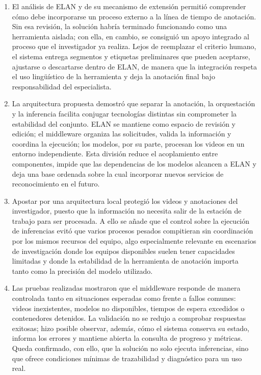 \begin{enumerate}
    \item El análisis de ELAN y de su mecanismo de extensión permitió comprender cómo debe incorporarse un proceso externo a la línea de tiempo de anotación. Sin esa revisión, la solución habría terminado funcionando como una herramienta aislada; con ella, en cambio, se consiguió un apoyo integrado al proceso que el investigador ya realiza. Lejos de reemplazar el criterio humano, el sistema entrega segmentos y etiquetas preliminares que pueden aceptarse, ajustarse o descartarse dentro de ELAN, de manera que la integración respeta el uso lingüístico de la herramienta y deja la anotación final bajo responsabilidad del especialista.

    \item La arquitectura propuesta demostró que separar la anotación, la orquestación y la inferencia facilita conjugar tecnologías distintas sin comprometer la estabilidad del conjunto. ELAN se mantiene como espacio de revisión y edición; el middleware organiza las solicitudes, valida la información y coordina la ejecución; los modelos, por su parte, procesan los videos en un entorno independiente. Esta división reduce el acoplamiento entre componentes, impide que las dependencias de los modelos alcancen a ELAN y deja una base ordenada sobre la cual incorporar nuevos servicios de reconocimiento en el futuro.

    \item Apostar por una arquitectura local protegió los videos y anotaciones del investigador, puesto que la información no necesita salir de la estación de trabajo para ser procesada. A ello se añade que el control sobre la ejecución de inferencias evitó que varios procesos pesados compitieran sin coordinación por los mismos recursos del equipo, algo especialmente relevante en escenarios de investigación donde los equipos disponibles suelen tener capacidades limitadas y donde la estabilidad de la herramienta de anotación importa tanto como la precisión del modelo utilizado.

    \item Las pruebas realizadas mostraron que el middleware responde de manera controlada tanto en situaciones esperadas como frente a fallos comunes: videos inexistentes, modelos no disponibles, tiempos de espera excedidos o contenedores detenidos. La validación no se redujo a comprobar respuestas exitosas; hizo posible observar, además, cómo el sistema conserva su estado, informa los errores y mantiene abierta la consulta de progreso y métricas. Queda confirmado, con ello, que la solución no solo ejecuta inferencias, sino que ofrece condiciones mínimas de trazabilidad y diagnóstico para un uso real.


\end{enumerate}
